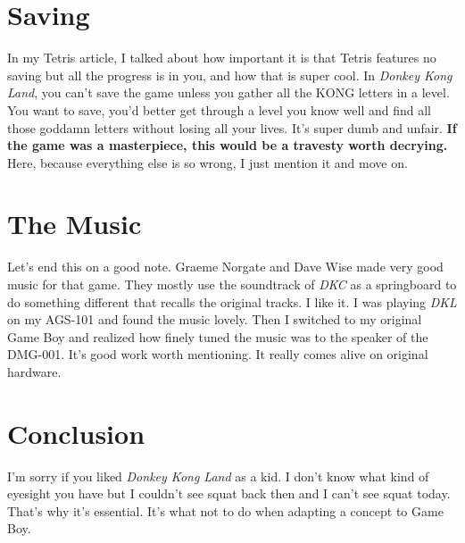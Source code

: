 \documentclass{book}
\begin{document}
\FloatBarrier\needspace{10mm}\section*{Saving}\nopagebreak[4]

In my Tetris article, I talked about how important it is that Tetris features no saving but all the progress is in you, and how that is super cool. In \emph{Donkey Kong Land}, you can’t save the game unless you gather all the KONG letters in a level. You want to save, you’d better get through a level you know well and find all those goddamn letters without losing all your lives. It’s super dumb and unfair. \textbf{If the game was a masterpiece, this would be a travesty worth decrying.} Here, because everything else is so wrong, I just mention it and move on.

\FloatBarrier\needspace{10mm}\section*{The Music}\nopagebreak[4]

Let’s end this on a good note. Graeme Norgate and Dave Wise made very good music for that game. They mostly use the soundtrack of \emph{DKC} as a springboard to do something different that recalls the original tracks. I like it. I was playing \emph{DKL} on my AGS-101 and found the music lovely. Then I switched to my original Game Boy and realized how finely tuned the music was to the speaker of the DMG-001. It’s good work worth mentioning. It really comes alive on original hardware.

\FloatBarrier\needspace{10mm}\section*{Conclusion}\nopagebreak[4]

I’m sorry if you liked \emph{Donkey Kong Land} as a kid. I don’t know what kind of eyesight you have but I couldn’t see squat back then and I can’t see squat today. That’s why it’s essential. It’s what not to do when adapting a concept to Game Boy.
\end{document}
